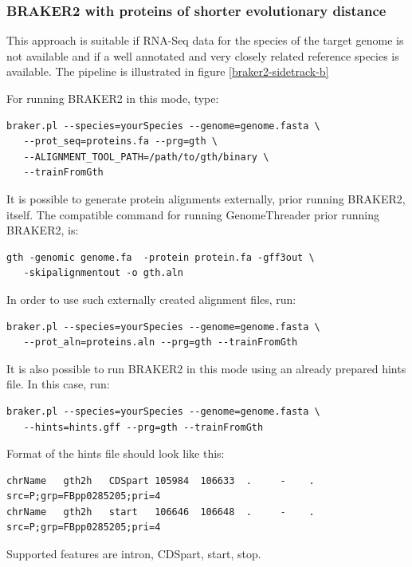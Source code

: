 \documentclass[]{article}
\begin{document}
\subsubsection{BRAKER2 with proteins of shorter evolutionary distance}\label{prot-in}

This approach is suitable if RNA-Seq data for the species of the target
genome is not available and if a well annotated and very closely related
reference species is available. The pipeline is illustrated in figure
\ref{braker2-sidetrack-b}

For running BRAKER2 in this mode, type:

\begin{verbatim}
braker.pl --species=yourSpecies --genome=genome.fasta \
   --prot_seq=proteins.fa --prg=gth \
   --ALIGNMENT_TOOL_PATH=/path/to/gth/binary \
   --trainFromGth
\end{verbatim}

It is possible to generate protein alignments externally, prior running
BRAKER2, itself. The compatible command for running GenomeThreader prior
running BRAKER2, is:

\begin{verbatim}
gth -genomic genome.fa  -protein protein.fa -gff3out \
   -skipalignmentout -o gth.aln
\end{verbatim}

In order to use such externally created alignment files, run:

\begin{verbatim}
braker.pl --species=yourSpecies --genome=genome.fasta \
   --prot_aln=proteins.aln --prg=gth --trainFromGth
\end{verbatim}

It is also possible to run BRAKER2 in this mode using an already
prepared hints file. In this case, run:

\begin{verbatim}
braker.pl --species=yourSpecies --genome=genome.fasta \
   --hints=hints.gff --prg=gth --trainFromGth
\end{verbatim}

Format of the hints file should look like this:

\begin{verbatim}
chrName   gth2h   CDSpart 105984  106633  .     -    .    src=P;grp=FBpp0285205;pri=4
chrName   gth2h   start   106646  106648  .     -    .    src=P;grp=FBpp0285205;pri=4
\end{verbatim}

Supported features are intron, CDSpart, start, stop.
\end{document}
